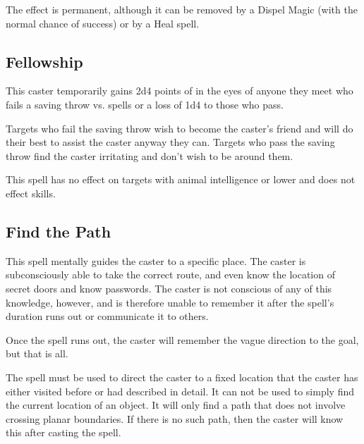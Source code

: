 \begin{multicols*}{2}
The effect is permanent, although it can be removed by a Dispel Magic (with the normal chance of success) or by a Heal spell.

\subsection{Fellowship}\label{spell:Fellowship}

This caster temporarily gains 2d4 points of  in the eyes of anyone they meet who fails a saving throw vs. spells or a loss of 1d4 to those who pass.

Targets who fail the saving throw wish to become the caster's friend and will do their best to assist the caster anyway they can. Targets who pass the saving throw find the caster irritating and don't wish to be around them.

This spell has no effect on targets with animal intelligence or lower and does not effect  skills.

\subsection{Find the Path}\label{spell:Find the Path}

This spell mentally guides the caster to a specific place. The caster is subconsciously able to take the correct route, and even know the location of secret doors and know passwords. The caster is not conscious of any of this knowledge, however, and is therefore unable to remember it after the spell’s duration runs out or communicate it to others.

Once the spell runs out, the caster will remember the vague direction to the goal, but that is all.

The spell must be used to direct the caster to a fixed location that the caster has either visited before or had described in detail. It can not be used to simply find the current location of an object. It will only find a path that does not involve crossing planar boundaries. If there is no such path, then the caster will know this after casting the spell.


\end{multicols*}
